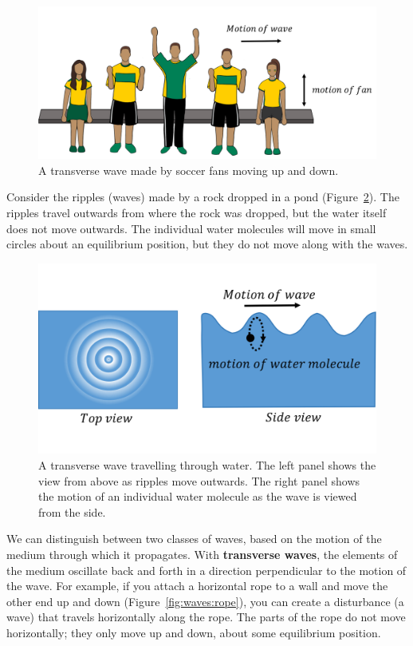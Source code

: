 \begin{figure}[!htbp]
\centering
\includegraphics[width=0.8\linewidth]{files/soccer-09bc9ff0a701ec33a391b979a7f81fbf.png}
\caption[]{A transverse wave made by soccer fans moving up and down.}
\label{fig:waves:soccer}
\end{figure}

Consider the ripples (waves) made by a rock dropped in a pond (Figure~\ref{fig:waves:water}). The ripples travel outwards from where the rock was dropped, but the water itself does not move outwards. The individual water molecules will move in small circles about an equilibrium position, but they do not move along with the waves.

\begin{figure}[!htbp]
\centering
\includegraphics[width=0.6\linewidth]{files/water-fcfb7b7981c2ab5310c1575077308bf3.png}
\caption[]{A transverse wave travelling through water. The left panel shows the view from above as ripples move outwards. The right panel shows the motion of an individual water molecule as the wave is viewed from the side.}
\label{fig:waves:water}
\end{figure}

We can distinguish between two classes of waves, based on the motion of the medium through which it propagates. With \textbf{transverse waves}, the elements of the medium oscillate back and forth in a direction perpendicular to the motion of the wave. For example, if you attach a horizontal rope to a wall and move the other end up and down (Figure~\ref{fig:waves:rope}), you can create a disturbance (a wave) that travels horizontally along the rope. The parts of the rope do not move horizontally; they only move up and down, about some equilibrium position.

